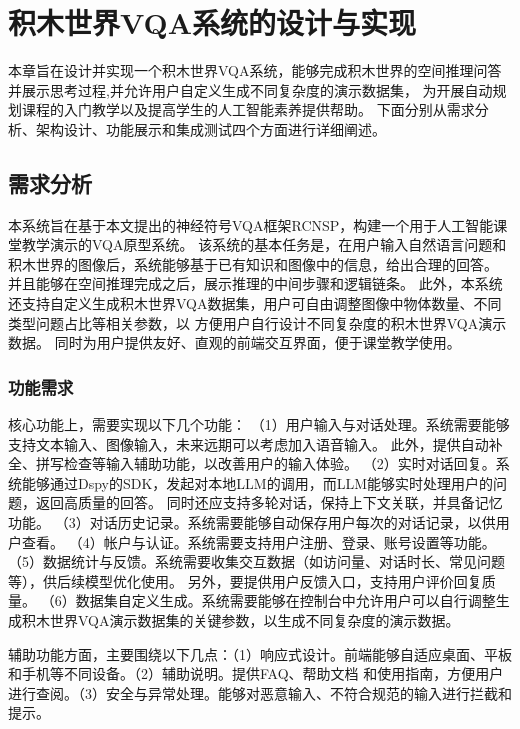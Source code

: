 \chapter{积木世界VQA系统的设计与实现}
本章旨在设计并实现一个积木世界VQA系统，能够完成积木世界的空间推理问答并展示思考过程,并允许用户自定义生成不同复杂度的演示数据集，
为开展自动规划课程的入门教学以及提高学生的人工智能素养提供帮助。
下面分别从需求分析、架构设计、功能展示和集成测试四个方面进行详细阐述。
\section{需求分析}
本系统旨在基于本文提出的神经符号VQA框架RCNSP，构建一个用于人工智能课堂教学演示的VQA原型系统。
该系统的基本任务是，在用户输入自然语言问题和积木世界的图像后，系统能够基于已有知识和图像中的信息，给出合理的回答。
并且能够在空间推理完成之后，展示推理的中间步骤和逻辑链条。
此外，本系统还支持自定义生成积木世界VQA数据集，用户可自由调整图像中物体数量、不同类型问题占比等相关参数，以
方便用户自行设计不同复杂度的积木世界VQA演示数据。
同时为用户提供友好、直观的前端交互界面，便于课堂教学使用。

\subsection{功能需求}
核心功能上，需要实现以下几个功能：
（1）用户输入与对话处理。系统需要能够支持文本输入、图像输入，未来远期可以考虑加入语音输入。
此外，提供自动补全、拼写检查等输入辅助功能，以改善用户的输入体验。
（2）实时对话回复。系统能够通过Dspy的SDK，发起对本地LLM的调用，而LLM能够实时处理用户的问题，返回高质量的回答。
同时还应支持多轮对话，保持上下文关联，并具备记忆功能。
（3）对话历史记录。系统需要能够自动保存用户每次的对话记录，以供用户查看。
（4）帐户与认证。系统需要支持用户注册、登录、账号设置等功能。
（5）数据统计与反馈。系统需要收集交互数据（如访问量、对话时长、常见问题等），供后续模型优化使用。
另外，要提供用户反馈入口，支持用户评价回复质量。
（6）数据集自定义生成。系统需要能够在控制台中允许用户可以自行调整生成积木世界VQA演示数据集的关键参数，以生成不同复杂度的演示数据。

辅助功能方面，主要围绕以下几点：（1）响应式设计。前端能够自适应桌面、平板和手机等不同设备。（2）辅助说明。提供FAQ、帮助文档
和使用指南，方便用户进行查阅。（3）安全与异常处理。能够对恶意输入、不符合规范的输入进行拦截和提示。
